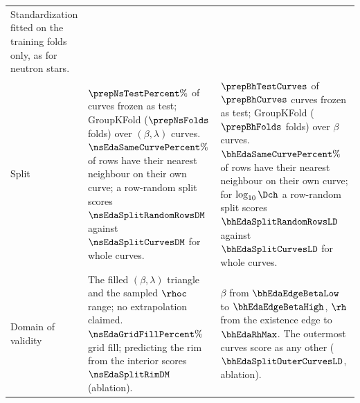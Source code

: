 \begin{table}[!htb]
\begin{tabular}{p{2.0cm} p{4.6cm} p{4.6cm}}
Standardization fitted on the training folds only, as for neutron stars. \\
Split &
$\prepNsTestPercent\%$ of curves frozen as test; GroupKFold ($\prepNsFolds$ folds) over $(\beta, \lambda)$ curves. $\nsEdaSameCurvePercent\%$ of rows have their nearest neighbour on their own curve; a row-random split scores $\nsEdaSplitRandomRowsDM$ against $\nsEdaSplitCurvesDM$ for whole curves. &
$\prepBhTestCurves$ of $\prepBhCurves$ curves frozen as test; GroupKFold ($\prepBhFolds$ folds) over $\beta$ curves. $\bhEdaSameCurvePercent\%$ of rows have their nearest neighbour on their own curve; for $\log_{10}\Dch$ a row-random split scores $\bhEdaSplitRandomRowsLD$ against $\bhEdaSplitCurvesLD$ for whole curves. \\
Domain of validity &
The filled $(\beta, \lambda)$ triangle and the sampled $\rhoc$ range; no extrapolation claimed. $\nsEdaGridFillPercent\%$ grid fill; predicting the rim from the interior scores $\nsEdaSplitRimDM$ (ablation). &
$\beta$ from $\bhEdaEdgeBetaLow$ to $\bhEdaEdgeBetaHigh$, $\rh$ from the existence edge to $\bhEdaRhMax$. The outermost curves score as any other ($\bhEdaSplitOuterCurvesLD$, ablation). \\
\bottomrule
\end{tabular}
\end{table}
